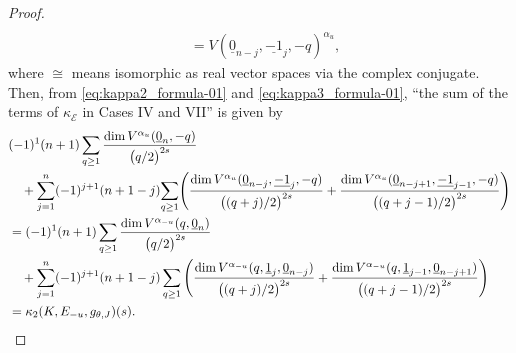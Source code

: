 \documentclass[pdftex]{sigma}
\numberwithin{equation}{section}
\newcommand{\cE}{\mathcal{E}}
\begin{document}
\begin{proof}
\begin{align*}
 \\
 & = V ( \underline{0}_{n-j} , \underline{-1}_{j} , -q )^{\alpha_{u}}
 ,
 \end{align*}
 where $\cong$ means isomorphic as real vector spaces via the complex conjugate.
 Then, from \eqref{eq:kappa2_formula-01} and
 \eqref{eq:kappa3_formula-01},
 ``the sum of the terms of $\kappa_{\cE}$ in Cases IV and VII''
 is given by
 \begin{align*}
 &
 (-1 )^{1} (n+1)
 \sum_{q \geq 1 }
 \frac{
 \dim V^{\alpha_u} ( \underline{0}_{n}, -q )
 }{
 \bigl( q /2 \bigr)^{2s}
 }
 \notag
 \\
 & \quad +
 \sum_{j=1}^{n}
 (-1 )^{j+1} (n+1-j)\!
 \sum_{q \geq 1 }\!
 \left(
 \frac{
 \dim V^{\alpha_u} ( \underline{0}_{n-j}, \underline{-1}_{j} , -q )
 }{
 \bigl( ( q+j)/2 \bigr)^{2s}
 }
 +
 \frac{
 \dim V^{\alpha_u} ( \underline{0}_{n-j+1}, \underline{-1}_{j-1} , -q )
 }{
 \bigl( (q+j-1)/2 \bigr)^{2s}
 }
 \right)
 \notag
 \\
 & =
 (-1 )^{1} (n+1)
 \sum_{q \geq 1 }
 \frac{
 \dim V^{\alpha_{-u}} ( q, \underline{0}_{n} )
 }{
 \bigl( q /2 \bigr)^{2s}
 }
 \notag
 \\
 & \quad +
 \sum_{j=1}^{n}
 (-1 )^{j+1} (n+1-j)
 \sum_{q \geq 1 }
 \left(
 \frac{
 \dim V^{\alpha_{-u}} ( q, \underline{1}_{j} ,\underline{0}_{n-j} )
 }{
 \bigl( ( q+j)/2 \bigr)^{2s}
 }
 +
 \frac{
 \dim V^{\alpha_{-u}} ( q, \underline{1}_{j-1} ,\underline{0}_{n-j+1} )
 }{
 \bigl( (q+j-1)/2 \bigr)^{2s}
 }
 \right)
 \notag
 \\
 & =
 \kappa_{2} (K, E_{-u} , g_{\theta , J} ) (s).
 \tag*{\qed}
 \end{align*}
\renewcommand{\qed}{}
\end{proof}
\end{document}
